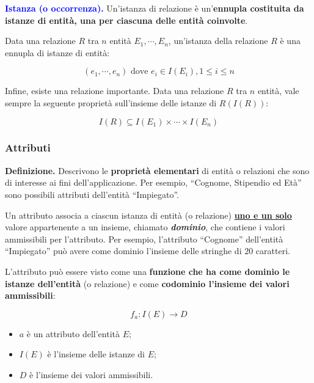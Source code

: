 \documentclass[a4paper]{article}
\newcommand{\dquotes}[1]{``#1''}
\begin{document}
	\noindent
	\textcolor{blue}{\textbf{Istanza (o occorrenza).}} Un'istanza di relazione è un'\textbf{ennupla costituita da istanze di entità, una per ciascuna delle entità coinvolte}.
	
	\noindent
	Data una relazione $R$ tra $n$ entità $E_1, \cdots, E_n$, un’istanza della relazione $R$ è una ennupla di istanze di entità:
	
	\begin{equation*}
		\left(e_1, \cdots, e_n\right) \text{ dove } e_i \in I(E_i), 1\le i \le n
	\end{equation*}

	\noindent
	Infine, esiste una relazione importante. Data una relazione $R$ tra $n$ entità, vale sempre la seguente proprietà sull’insieme delle istanze di $R (I(R))$:
	
	\begin{equation*}
		I(R) \subseteq I(E_1) \times \cdots \times I(E_n)
	\end{equation*}
	
	\newpage
	
	
	
	
	\subsubsection{Attributi}\label{par: attributi}
	
	\textcolor{Red3}{\textbf{Definizione.}} Descrivono le \textbf{proprietà elementari} di entità o relazioni che sono di interesse ai fini dell'applicazione. Per esempio, \dquotes{Cognome, Stipendio ed Età} sono possibili attributi dell'entità \dquotes{Impiegato}.
	
	Un attributo associa a ciascun istanza di entità (o relazione) \textbf{\underline{uno e un solo}} valore appartenente a un insieme, chiamato \textbf{\emph{dominio}}, che contiene i valori ammissibili per l'attributo. Per esempio, l'attributo \dquotes{Cognome} dell'entità \dquotes{Impiegato} può avere come dominio l'insieme delle stringhe di $20$ caratteri.
	
	L'attributo può essere visto come una \textbf{funzione che ha come dominio le istanze dell'entità} (o relazione) e come \textbf{codominio l'insieme dei valori ammissibili}:
	
	\begin{equation*}
		f_{a} : I\left(E\right) \rightarrow D
	\end{equation*}

	\begin{itemize}
		\item $a$ è un attributo dell'entità $E$;
		
		\item $I\left(E\right)$ è l'insieme delle istanze di $E$;
		
		\item $D$ è l'insieme dei valori ammissibili.
	\end{itemize}
	
\end{document}
